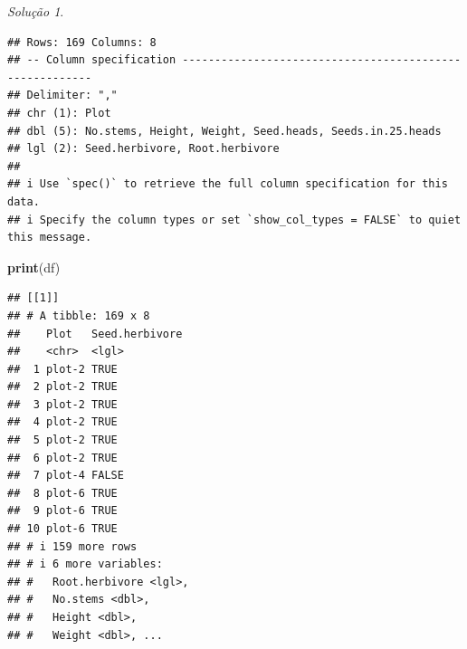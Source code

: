 \documentclass[
]{latex/krantz}
\newenvironment{Shaded}{\begin{snugshade}}{\end{snugshade}}
\newcommand{\AttributeTok}[1]{\textcolor[rgb]{0.13,0.29,0.53}{#1}}
\newcommand{\ConstantTok}[1]{\textcolor[rgb]{0.56,0.35,0.01}{#1}}
\newcommand{\ControlFlowTok}[1]{\textcolor[rgb]{0.13,0.29,0.53}{\textbf{#1}}}
\newcommand{\FunctionTok}[1]{\textcolor[rgb]{0.13,0.29,0.53}{\textbf{#1}}}
\newcommand{\NormalTok}[1]{#1}
\newcommand{\OtherTok}[1]{\textcolor[rgb]{0.56,0.35,0.01}{#1}}
\newcommand{\SpecialCharTok}[1]{\textcolor[rgb]{0.81,0.36,0.00}{\textbf{#1}}}
\newcommand{\StringTok}[1]{\textcolor[rgb]{0.31,0.60,0.02}{#1}}
\theoremstyle{definition}
\theoremstyle{definition}
\theoremstyle{definition}
\theoremstyle{definition}
\theoremstyle{remark}
\newtheorem*{solution}{Solução}
\begin{document}
\begin{solution}
\leavevmode

\begin{Shaded}
\end{Shaded}

\begin{verbatim}
## Rows: 169 Columns: 8
## -- Column specification --------------------------------------------------------
## Delimiter: ","
## chr (1): Plot
## dbl (5): No.stems, Height, Weight, Seed.heads, Seeds.in.25.heads
## lgl (2): Seed.herbivore, Root.herbivore
## 
## i Use `spec()` to retrieve the full column specification for this data.
## i Specify the column types or set `show_col_types = FALSE` to quiet this message.
\end{verbatim}

\begin{Shaded}
\begin{Highlighting}[]
\FunctionTok{print}\NormalTok{(df)}
\end{Highlighting}
\end{Shaded}

\begin{verbatim}
## [[1]]
## # A tibble: 169 x 8
##    Plot   Seed.herbivore
##    <chr>  <lgl>         
##  1 plot-2 TRUE          
##  2 plot-2 TRUE          
##  3 plot-2 TRUE          
##  4 plot-2 TRUE          
##  5 plot-2 TRUE          
##  6 plot-2 TRUE          
##  7 plot-4 FALSE         
##  8 plot-6 TRUE          
##  9 plot-6 TRUE          
## 10 plot-6 TRUE          
## # i 159 more rows
## # i 6 more variables:
## #   Root.herbivore <lgl>,
## #   No.stems <dbl>,
## #   Height <dbl>,
## #   Weight <dbl>, ...
\end{verbatim}


\end{solution}
\end{document}
